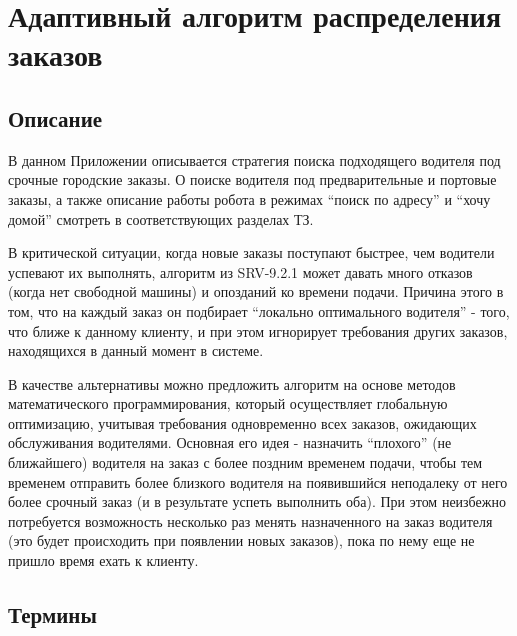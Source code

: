\section{Адаптивный алгоритм распределения заказов}

	\subsection{Описание}

		В данном Приложении описывается стратегия поиска подходящего водителя под срочные городские заказы. О поиске водителя под предварительные и портовые заказы, а также описание работы робота в режимах “поиск по адресу” и “хочу домой” смотреть в соответствующих разделах ТЗ.

		В критической ситуации, когда новые заказы поступают быстрее, чем водители успевают их выполнять, алгоритм из SRV-9.2.1 может давать много отказов (когда нет свободной машины) и опозданий ко времени подачи. Причина этого в том, что на каждый заказ он подбирает “локально оптимального водителя” - того, что ближе к данному клиенту, и при этом игнорирует требования других заказов, находящихся в данный момент в системе.

		В качестве альтернативы можно предложить алгоритм на основе методов математического программирования, который осуществляет глобальную оптимизацию, учитывая требования одновременно всех заказов, ожидающих обслуживания водителями. Основная его идея - назначить “плохого” (не ближайшего) водителя на заказ с более поздним временем подачи, чтобы тем временем отправить более близкого водителя на появившийся неподалеку от него более срочный заказ (и в результате успеть выполнить оба). При этом неизбежно потребуется возможность несколько раз менять назначенного на заказ водителя (это будет происходить при появлении новых заказов), пока по нему еще не пришло время ехать к клиенту.

	\subsection{Термины}


